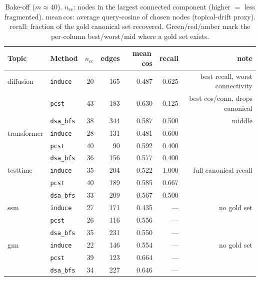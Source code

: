 \documentclass[11pt]{article}
\newcommand{\g}[1]{\textcolor{good}{#1}}
\newcommand{\bd}[1]{\textcolor{bad}{#1}}
\newcommand{\md}[1]{\textcolor{mid}{#1}}
\newcommand{\code}[1]{\texttt{\small #1}}
\begin{document}
\begin{table}[h]\centering\small
\begin{tabular}{l l r r r r r}
\toprule
Topic & Method & $n_{\text{cc}}$ & edges & mean\,cos & recall & note\\
\midrule
diffusion   & \code{induce}  & 20 & 165 & 0.487 & \g{0.625} & best recall, worst connectivity\\
            & \code{pcst}    & 43 & 183 & \g{0.630} & \bd{0.125} & best cos/conn, drops canonical\\
            & \code{dsa\_bfs}& 38 & 344 & 0.587 & \md{0.500} & middle\\
\addlinespace
transformer & \code{induce}  & 28 & 131 & 0.481 & \g{0.600} & \\
            & \code{pcst}    & 40 &  90 & \g{0.592} & 0.400 & \\
            & \code{dsa\_bfs}& 36 & 156 & 0.577 & 0.400 & \\
\addlinespace
testtime    & \code{induce}  & 35 & 204 & 0.522 & \g{1.000} & full canonical recall\\
            & \code{pcst}    & 40 & 189 & \g{0.585} & 0.667 & \\
            & \code{dsa\_bfs}& 33 & 209 & 0.567 & 0.500 & \\
\addlinespace
ssm         & \code{induce}  & 27 & 171 & 0.435 & --- & no gold set\\
            & \code{pcst}    & 26 & 116 & \g{0.556} & --- & \\
            & \code{dsa\_bfs}& 35 & 231 & 0.550 & --- & \\
\addlinespace
gnn         & \code{induce}  & 22 & 146 & 0.554 & --- & no gold set\\
            & \code{pcst}    & 39 & 123 & \g{0.664} & --- & \\
            & \code{dsa\_bfs}& 34 & 227 & 0.646 & --- & \\
\bottomrule
\end{tabular}
\caption{Bake-off ($m\approx40$). $n_{\text{cc}}$: nodes in the largest connected component (higher
$=$ less fragmented). mean\,cos: average query-cosine of chosen nodes (topical-drift proxy). recall:
fraction of the gold canonical set recovered. \g{Green}/\bd{red}/\md{amber} mark the per-column
best/worst/mid where a gold set exists.}
\end{table}
\end{document}
